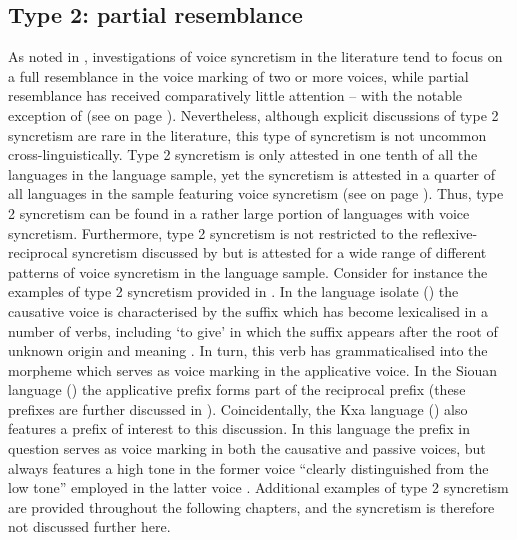 \subsection{Type 2: partial resemblance} \label{resemblance-type2}
As noted in , investigations of voice syncretism in the literature tend to focus on a full resemblance in the voice marking of two or more voices, while partial resemblance has received comparatively little attention -- with the notable exception of \citeauthor{nedjalkov:2007d} (see  on page \pageref{tab:ch1:nedjalkov-examples}). Nevertheless, although explicit discussions of type 2 syncretism are rare in the literature, this type of syncretism is not uncommon cross-linguistically. Type 2 syncretism is only attested in one tenth of all the languages in the language sample, yet the syncretism is attested in a quarter of all languages in the sample featuring voice syncretism (see  on page \pageref{tab:ch6:voice-syncretism-type-2}). Thus, type 2 syncretism can be found in a rather large portion of languages with voice syncretism. Furthermore, type 2 syncretism is not restricted to the reflexive-reciprocal syncretism discussed by \citet{nedjalkov:2007d} but is attested for a wide range of different patterns of voice syncretism in the language sample. Consider for instance the examples of type 2 syncretism provided in . In the language isolate  () the causative voice is characterised by the suffix  which has become lexicalised in a number of verbs, including  ‘to give’ in which the suffix appears after the root  of unknown origin and meaning \citep[372f.]{van-der-voort:2004}. In turn, this verb has grammaticalised into the morpheme  which serves as voice marking in the applicative voice. In the Siouan language  () the applicative prefix  forms part of the reciprocal prefix  (these prefixes are further discussed in ). Coincidentally, the Kxa language  () also features a prefix  of interest to this discussion. In this language the prefix in question serves as voice marking in both the causative and passive voices, but always features a high tone in the former voice “clearly distinguished from the low tone” employed in the latter voice \citep[166]{collins:gruber:2014}. Additional examples of type 2 syncretism are provided throughout the following chapters, and the syncretism is therefore not discussed further here.

